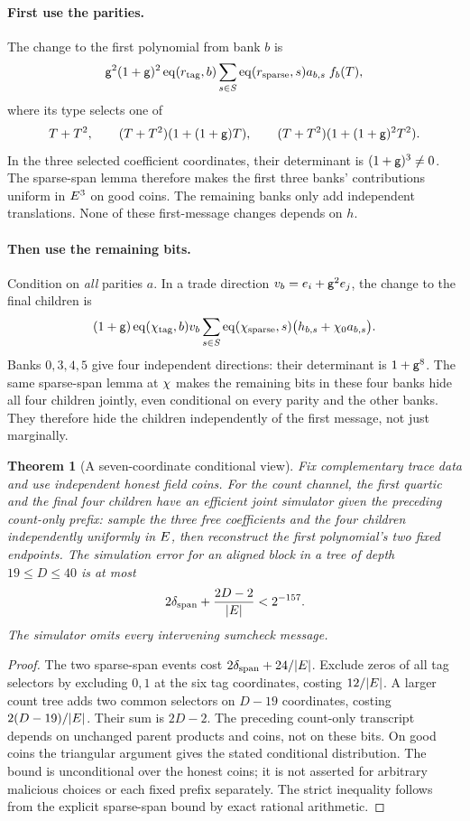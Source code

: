 \documentclass[11pt]{article}
\newtheorem{theorem}{Theorem}
\begin{document}
\paragraph{First use the parities.} The change to the first polynomial from bank $b$ is
\[
 \mathsf{g}^2(1+\mathsf{g})^2\operatorname{eq}(r_{\mathrm{tag}},b)
 \sum_{s\in S}\operatorname{eq}(r_{\mathrm{sparse}},s)a_{b,s}\;f_b(T),
\]
where its type selects one of
\[
 T+T^2,\qquad
 (T+T^2)(1+(1+\mathsf{g})T),\qquad
 (T+T^2)(1+(1+\mathsf{g})^2T^2).
\]
In the three selected coefficient coordinates, their determinant is $(1+\mathsf{g})^3\ne0$. The sparse-span lemma therefore makes the first three banks' contributions uniform in $E^3$ on good coins. The remaining banks only add independent translations. None of these first-message changes depends on $h$.

\paragraph{Then use the remaining bits.} Condition on \emph{all} parities $a$. In a trade direction $v_b=e_i+\mathsf{g}^2e_j$, the change to the final children is
\[
 (1+\mathsf{g})\operatorname{eq}(\chi_{\mathrm{tag}},b)v_b
 \sum_{s\in S}\operatorname{eq}(\chi_{\mathrm{sparse}},s)
 \bigl(h_{b,s}+\chi_0a_{b,s}\bigr).
\]
Banks $0,3,4,5$ give four independent directions: their determinant is $1+\mathsf{g}^8$. The same sparse-span lemma at $\chi$ makes the remaining bits in these four banks hide all four children jointly, even conditional on every parity and the other banks. They therefore hide the children independently of the first message, not just marginally.

\begin{theorem}[A seven-coordinate conditional view]
Fix complementary trace data and use independent honest field coins. For the count channel, the first quartic and the final four children have an efficient joint simulator given the preceding count-only prefix: sample the three free coefficients and the four children independently uniformly in $E$, then reconstruct the first polynomial's two fixed endpoints. The simulation error for an aligned block in a tree of depth $19\le D\le40$ is at most
\[
 2\delta_{\mathrm{span}}+\frac{2D-2}{|E|}<2^{-157}.
\]
The simulator omits every intervening sumcheck message.
\end{theorem}
\begin{proof}
The two sparse-span events cost $2\delta_{\mathrm{span}}+24/|E|$. Exclude zeros of all tag selectors by excluding $0,1$ at the six tag coordinates, costing $12/|E|$. A larger count tree adds two common selectors on $D-19$ coordinates, costing $2(D-19)/|E|$. Their sum is $2D-2$. The preceding count-only transcript depends on unchanged parent products and coins, not on these bits. On good coins the triangular argument gives the stated conditional distribution. The bound is unconditional over the honest coins; it is not asserted for arbitrary malicious choices or each fixed prefix separately. The strict inequality follows from the explicit sparse-span bound by exact rational arithmetic.
\end{proof}
\end{document}
